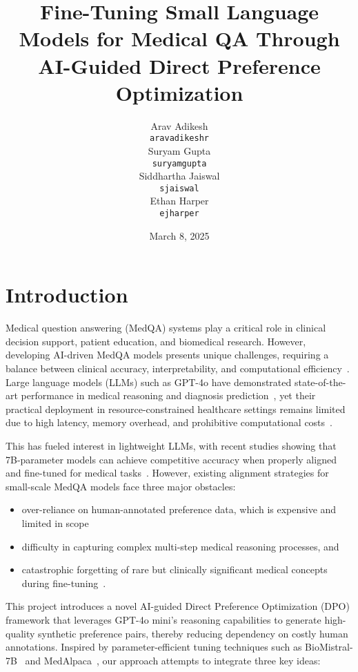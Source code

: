 \documentclass[11pt,a4paper]{article}
\title{Fine-Tuning Small Language Models for Medical QA Through AI-Guided Direct Preference Optimization}
\author{Arav Adikesh \\
  {\tt aravadikeshr} \\\And
  Suryam Gupta \\
  {\tt suryamgupta} \\\And
  Siddhartha Jaiswal \\
  {\tt sjaiswal} \\\And
  Ethan Harper \\
  {\tt ejharper} \\
  }
\date{March 8, 2025}
\begin{document}
\maketitle

\section{Introduction}

Medical question answering (MedQA) systems play a critical role in clinical decision support, patient education, and biomedical research. However, developing AI-driven MedQA models presents unique challenges, requiring a balance between clinical accuracy, interpretability, and computational efficiency~\cite{ekinci-2025}. Large language models (LLMs) such as GPT-4o have demonstrated state-of-the-art performance in medical reasoning and diagnosis prediction~\cite{nori2023capabilitiesgpt4medicalchallenge}, yet their practical deployment in resource-constrained healthcare settings remains limited due to high latency, memory overhead, and prohibitive computational costs~\cite{bai2024efficiencysystematicsurveyresourceefficient}. 

This has fueled interest in lightweight LLMs, with recent studies showing that 7B-parameter models can achieve competitive accuracy when properly aligned and fine-tuned for medical tasks~\cite{tran2024bioinstructinstructiontuninglarge}. However, existing alignment strategies for small-scale MedQA models face three major obstacles: 
\begin{itemize}
    \item over-reliance on human-annotated preference data, which is expensive and limited in scope~\cite{ouyang-2022, bai2022constitutionalaiharmlessnessai}
    \item difficulty in capturing complex multi-step medical reasoning processes, and
    \item catastrophic forgetting of rare but clinically significant medical concepts during fine-tuning~\cite{ren2024analyzingreducingcatastrophicforgetting, luo2025empiricalstudycatastrophicforgetting}.
\end{itemize}   

This project introduces a novel AI-guided Direct Preference Optimization (DPO) framework that leverages GPT-4o mini's reasoning capabilities to generate high-quality synthetic preference pairs, thereby reducing dependency on costly human annotations. Inspired by parameter-efficient tuning techniques such as BioMistral-7B~\cite{labrak2024biomistralcollectionopensourcepretrained} and MedAlpaca~\cite{han2023medalpacaopensourcecollection}, our approach attempts to integrate three key ideas: 
\end{document}
